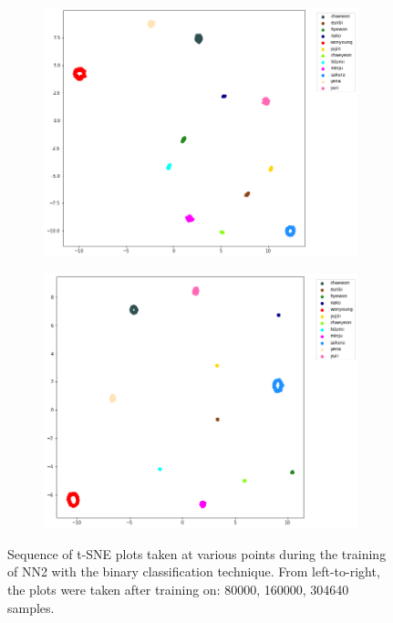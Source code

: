 \begin{enumerate}[left=0pt]
\begin{figure}[htbp]
\begin{subfigure}{0.325\textwidth}
        \includegraphics[trim=35 20 100 0, clip, width=\textwidth]{images/faceReco/nn2-and-binary/tsne-2.png}     
    \end{subfigure}
    \hfill
    \begin{subfigure}{0.325\textwidth}
        \centering
        \includegraphics[trim=26 20 100 0, clip, width=\textwidth]{images/faceReco/nn2-and-binary/tsne-3.png}     
    \end{subfigure}

    \caption{
        Sequence of t-SNE plots taken at various points during the training of NN2 with the binary classification technique.
        From left-to-right, the plots were taken after training on: 80000, 160000, 304640 samples.
    }
    \label{Figure:Face-Recognition:Results:nn2-and-binary-tsne-sequence}
\end{figure}


\end{enumerate}
